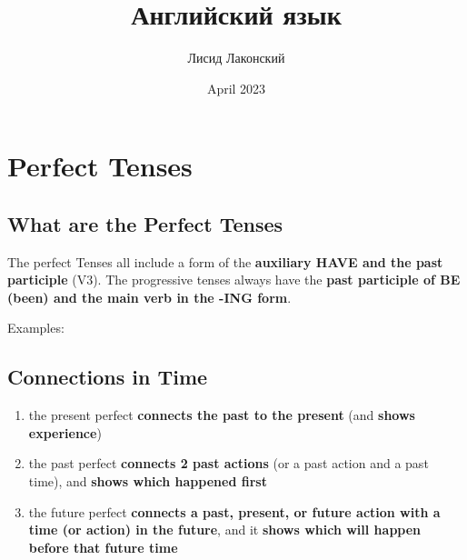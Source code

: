 \documentclass{article}
\title{Английский язык}
\author{Лисид Лаконский}
\date{April 2023}
\begin{document}
\raggedright

\maketitle
\tableofcontents
\pagebreak

\section{Perfect Tenses}

\subsection{What are the Perfect Tenses}

The perfect Tenses all include a form of the \textbf{auxiliary HAVE and the past participle} (V3). The progressive tenses always have the \textbf{past participle of BE (been) and the main verb in the -ING form}.

Examples:

\begin{multienumerate}
\end{multienumerate}

\subsection{Connections in Time}

\begin{enumerate}
    \item the present perfect \textbf{connects the past to the present} (and \textbf{shows experience})
    \item the past perfect \textbf{connects 2 past actions} (or a past action and a past time), and \textbf{shows which happened first}
    \item the future perfect \textbf{connects a past, present, or future action with a time (or action) in the future}, and it \textbf{shows which will happen before that future time}
\end{enumerate}
\end{document}
